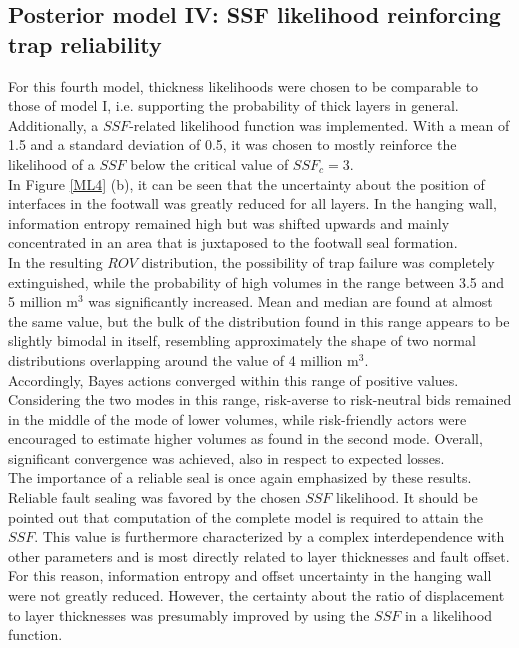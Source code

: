 		\subsection{Posterior model IV: SSF likelihood reinforcing trap reliability}%
		For this fourth model, thickness likelihoods were chosen to be comparable to those of model I, i.e. supporting the probability of thick layers in general. Additionally, a $SSF$-related likelihood function was implemented. With a mean of 1.5 and a standard deviation of 0.5, it was chosen to mostly reinforce the likelihood of a $SSF$ below the critical value of $SSF_c = 3$.\\
		In Figure \ref{ML4} (b), it can be seen that the uncertainty about the position of interfaces in the footwall was greatly reduced for all layers. In the hanging wall, information entropy remained high but was shifted upwards and mainly concentrated in an area that is juxtaposed to the footwall seal formation.\\
		In the resulting $ROV$ distribution, the possibility of trap failure was completely extinguished, while the probability of high volumes in the range between 3.5  and 5 million m$^3$ was significantly increased. Mean and median are found at almost the same value, but the bulk of the distribution found in this range appears to be slightly bimodal in itself, resembling approximately the shape of two normal distributions overlapping around the value of 4 million m$^3$.\\
		Accordingly, Bayes actions converged within this range of positive values. Considering the two modes in this range, risk-averse to risk-neutral bids remained in the middle of the mode of lower volumes, while risk-friendly actors were encouraged to estimate higher volumes as found in the second mode. Overall, significant convergence was achieved, also in respect to expected losses.\\		
		The importance of a reliable seal is once again emphasized by these results. Reliable fault sealing was favored by the chosen $SSF$ likelihood. It should be pointed out that computation of the complete model is required to attain the $SSF$. This value is furthermore characterized by a complex interdependence with other parameters and is most directly related to layer thicknesses and fault offset. For this reason, information entropy and offset uncertainty in the hanging wall were not greatly reduced. However, the certainty about the ratio of displacement to layer thicknesses was presumably improved by using the $SSF$ in a likelihood function.
		
